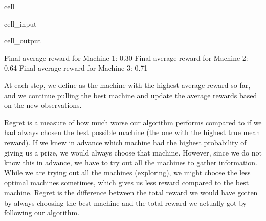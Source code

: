 \documentclass[letterpaper,10pt,english]{jupyterBook}
\begin{document}
\begin{sphinxuseclass}{cell}
\begin{sphinxVerbatimInput}
\begin{sphinxuseclass}{cell_input}
\begin{sphinxVerbatim}[commandchars=\\\{\}]
    
\end{sphinxVerbatim}

\end{sphinxuseclass}\end{sphinxVerbatimInput}
\begin{sphinxVerbatimOutput}

\begin{sphinxuseclass}{cell_output}
\begin{sphinxVerbatim}[commandchars=\\\{\}]
Final average reward for Machine 1: 0.30
Final average reward for Machine 2: 0.64
Final average reward for Machine 3: 0.71
\end{sphinxVerbatim}

\end{sphinxuseclass}\end{sphinxVerbatimOutput}

\end{sphinxuseclass}
\sphinxAtStartPar
At each step, we define as  the machine with the highest average reward so far, and we continue pulling the best machine and update the average rewards based on the new observations.

\sphinxAtStartPar
{}

\sphinxAtStartPar
Regret is a measure of how much worse our algorithm performs compared to if we had always chosen the best possible machine (the one with the highest true mean reward). If we knew in advance which machine had the highest probability of giving us a prize, we would always choose that machine. However, since we do not know this in advance, we have to try out all the machines to gather information. While we are trying out all the machines (exploring), we might choose the less optimal machines sometimes, which gives us less reward compared to the best machine.
Regret is the difference between the total reward we would have gotten by always choosing the best machine and the total reward we actually got by following our algorithm.
\end{document}
